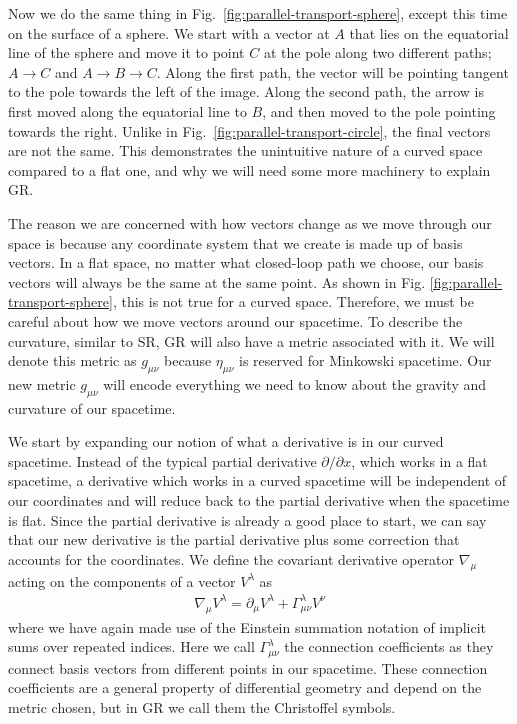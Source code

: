 \begin{bibunit}[unsrtnat]
Now we do the same thing in Fig.~\ref{fig:parallel-transport-sphere}, except
this time on the surface of a sphere. We start with a vector at $A$ that lies on
the equatorial line of the sphere and move it to point $C$ at the pole along two
different paths; $A\rightarrow C$ and $A\rightarrow B\rightarrow C$. Along the
first path, the vector will be pointing tangent to the pole towards the left of
the image. Along the second path, the arrow is first moved along the equatorial
line to $B$, and then moved to the pole pointing towards the right. Unlike in
Fig.~\ref{fig:parallel-transport-circle}, the final vectors are not the same.
This demonstrates the unintuitive nature of a curved space compared to a flat
one, and why we will need some more machinery to explain GR.

The reason we are concerned with how vectors change as we move through our space
is because any coordinate system that we create is made up of basis vectors. In
a flat space, no matter what closed-loop path we choose, our basis vectors will
always be the same at the same point. As shown in Fig.
\ref{fig:parallel-transport-sphere}, this is not true for a curved space.
Therefore, we must be careful about how we move vectors around our spacetime. To
describe the curvature, similar to SR, GR will also have a metric associated
with it. We will denote this metric as $g_{\mu\nu}$ because $\eta_{\mu\nu}$ is
reserved for Minkowski spacetime. Our new metric $g_{\mu\nu}$ will encode
everything we need to know about the gravity and curvature of our spacetime.

We start by expanding our notion of what a derivative is in our curved
spacetime. Instead of the typical partial derivative $\partial/\partial x$,
which works in a flat spacetime, a derivative which works in a curved
spacetime will be independent of our coordinates and will reduce back to the
partial derivative when the spacetime is flat. Since the partial derivative is
already a good place to start, we can say that our new derivative is the partial
derivative plus some correction that accounts for the coordinates. We define the
covariant derivative operator $\nabla_\mu$ acting on the components of a vector
$V^\lambda$ as
\begin{eqnarray}
   \nabla_\mu V^\lambda = \partial_\mu V^\lambda + \Gamma^\lambda_{\mu\nu}
   V^\nu
\end{eqnarray}
where we have again made use of the Einstein summation notation of implicit sums
over repeated indices. Here we call $\Gamma^\lambda_{\mu\nu}$ the connection
coefficients as they connect basis vectors from different points in our
spacetime. These connection coefficients are a general property of differential
geometry and depend on the metric chosen, but in GR we call them the Christoffel
symbols.


\end{bibunit}
